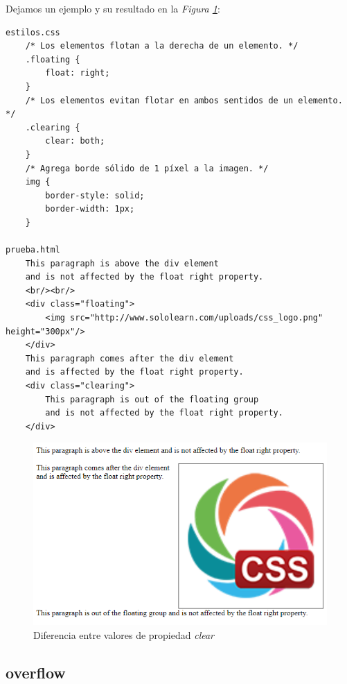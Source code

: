 Dejamos un ejemplo y su resultado en la \textit{Figura \ref{fig: 30}}:
\begin{lstlisting}
estilos.css
    /* Los elementos flotan a la derecha de un elemento. */
    .floating {
        float: right;
    }
    /* Los elementos evitan flotar en ambos sentidos de un elemento. */
    .clearing {    
        clear: both;
    }
    /* Agrega borde sólido de 1 píxel a la imagen. */
    img {
        border-style: solid;
        border-width: 1px;
    }

prueba.html
    This paragraph is above the div element 
    and is not affected by the float right property. 
    <br/><br/>
    <div class="floating">
        <img src="http://www.sololearn.com/uploads/css_logo.png" height="300px"/>
    </div>
    This paragraph comes after the div element 
    and is affected by the float right property. 
    <div class="clearing">
        This paragraph is out of the floating group 
        and is not affected by the float right property.
    </div>
\end{lstlisting}
\begin{figure}[H]
    \centering
    \caption{Diferencia entre valores de propiedad \textit{clear}}
    \label{fig: 30}
    \includegraphics[width=12cm]{ss/clear.png}
\end{figure}


\subsection{overflow}

